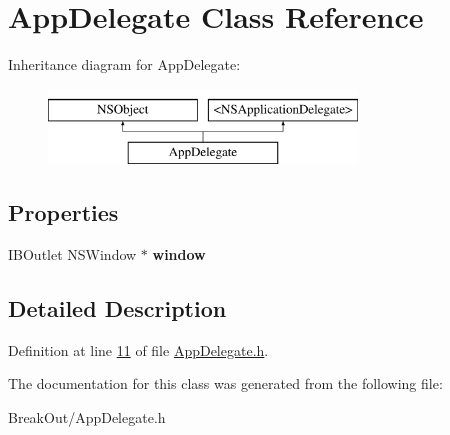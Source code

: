 \hypertarget{interface_app_delegate}{\section{App\-Delegate Class Reference}
\label{dd/d52/interface_app_delegate}
}
Inheritance diagram for App\-Delegate\-:\begin{figure}[H]
\begin{center}
\leavevmode
\includegraphics[height=2.000000cm]{dd/d52/interface_app_delegate}
\end{center}
\end{figure}
\subsection*{Properties}
\begin{DoxyCompactItemize}
\item 
\hypertarget{interface_app_delegate_acdf10c46711b4d6a8d95def15620afb6}{I\-B\-Outlet N\-S\-Window $\ast$ {\bfseries window}}\label{dd/d52/interface_app_delegate_acdf10c46711b4d6a8d95def15620afb6}

\end{DoxyCompactItemize}


\subsection{Detailed Description}


Definition at line \hyperlink{_app_delegate_8h_source_l00011}{11} of file \hyperlink{_app_delegate_8h_source}{App\-Delegate.\-h}.



The documentation for this class was generated from the following file\-:\begin{DoxyCompactItemize}
\item 
Break\-Out/App\-Delegate.\-h\end{DoxyCompactItemize}
